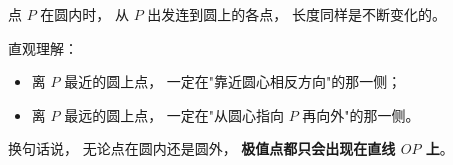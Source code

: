 \begin{explanationbox}
点 $P$ 在圆内时，
从 $P$ 出发连到圆上的各点，
长度同样是不断变化的。

直观理解：
\begin{itemize}
  \item 离 $P$ 最近的圆上点，
  一定在"靠近圆心相反方向"的那一侧；
  \item 离 $P$ 最远的圆上点，
  一定在"从圆心指向 $P$ 再向外"的那一侧。
\end{itemize}

换句话说，
无论点在圆内还是圆外，
\textbf{极值点都只会出现在直线 $OP$ 上}。
\end{explanationbox}
